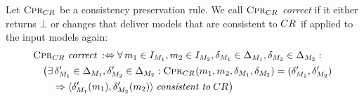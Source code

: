 \begin{definition}
    \label{def:consistencypreservationrulecorrectness}
    Let $\consistencypreservationrule{\consistencyrelation{CR}{}}$ be a consistency preservation rule.
    We call $\consistencypreservationrule{\consistencyrelation{CR}{}}$ \emph{correct} if it either returns $\bot$ or changes that deliver models that are consistent to $\consistencyrelation{CR}{}$ if applied to the input models again:
    \begin{align*} &
        \consistencypreservationrule{\consistencyrelation{CR}{}} \correctmath \equivalentperdefinition %
        \forall 
        \model{m}{1} \in \metamodelinstanceset{M}{1}, 
        \model{m}{2} \in \metamodelinstanceset{M}{2},
        \change{\metamodel{M}{1}} \in \changeuniverse{\metamodel{M}{1}},
        \change{\metamodel{M}{2}} \in \changeuniverse{\metamodel{M}{2}} : \\
        & \formulaskip
        \bigl( \exists 
        \change{\metamodel{M}{1}}' \in \changeuniverse{\metamodel{M}{1}},
        \change{\metamodel{M}{2}}' \in \changeuniverse{\metamodel{M}{2}} :
        \consistencypreservationrule{\consistencyrelation{CR}{}}(\model{m}{1}, \model{m}{2}, \change{\metamodel{M}{1}}, \change{\metamodel{M}{2}}) = (\change{\metamodel{M}{1}}', \change{\metamodel{M}{2}}') \\
        & \formulaskip\formulaskip
        \Rightarrow
        \tupled{\change{\metamodel{M}{1}}'(\model{m}{1}), \change{\metamodel{M}{2}}'(\model{m}{2})} \consistenttomath \consistencyrelation{CR}{} \bigr)
    \end{align*}
\end{definition}

